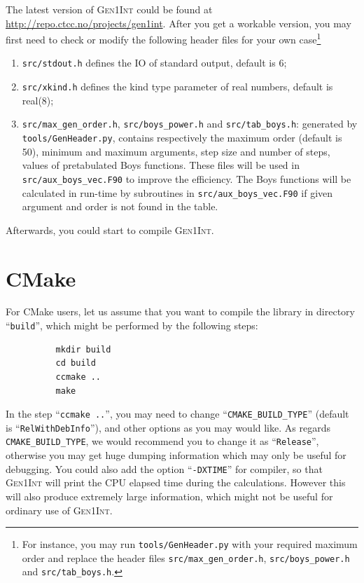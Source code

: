 \documentclass[a4paper,11pt,twoside,openright]{book}
\begin{document}
The latest version of \textsc{Gen1Int} could be found at \url{http://repo.ctcc.no/projects/gen1int}.
After you get a workable version, you may first need to check or modify the following header files
for your own case\footnote{For instance, you may run \texttt{tools/GenHeader.py} with your required
maximum order and replace the header files \texttt{src/max\_gen\_order.h}, \texttt{src/boys\_power.h}
and \texttt{src/tab\_boys.h}.}
\begin{enumerate}
  \item \verb|src/stdout.h| defines the IO of standard output, default is 6;
  \item \verb|src/xkind.h| defines the kind type parameter of real numbers, default is real(8);
  \item \verb|src/max_gen_order.h|, \verb|src/boys_power.h| and \verb|src/tab_boys.h|: generated by
    \verb|tools/GenHeader.py|, contains respectively the maximum order (default is 50), minimum and
    maximum arguments, step size and number of steps, values of pretabulated Boys functions. These
    files will be used in \verb|src/aux_boys_vec.F90| to improve the efficiency. The Boys functions
    will be calculated in run-time by subroutines in \verb|src/aux_boys_vec.F90| if given argument and
    order is not found in the table.
\end{enumerate}

Afterwards, you could start to compile \textsc{Gen1Int}.

\section{CMake}
\label{sect:install-cmake}

For CMake users, let us assume that you want to compile the library in directory ``\verb|build|'', which might
be performed by the following steps:
\begin{verbatim}
          mkdir build
          cd build
          ccmake ..
          make
\end{verbatim}

In the step ``\verb|ccmake ..|'', you may need to change ``\verb|CMAKE_BUILD_TYPE|'' (default is ``\verb|RelWithDebInfo|''),
and other options as you may would like. As regards \verb|CMAKE_BUILD_TYPE|, we would recommend you to change
it as ``\verb|Release|'', otherwise you may get huge dumping information which may only be useful for debugging. You could
also add the option ``\verb|-DXTIME|'' for compiler, so that \textsc{Gen1Int} will print the CPU elapsed time during the
calculations. However this will also produce extremely large information, which might not be useful for ordinary use of
\textsc{Gen1Int}.
\end{document}
